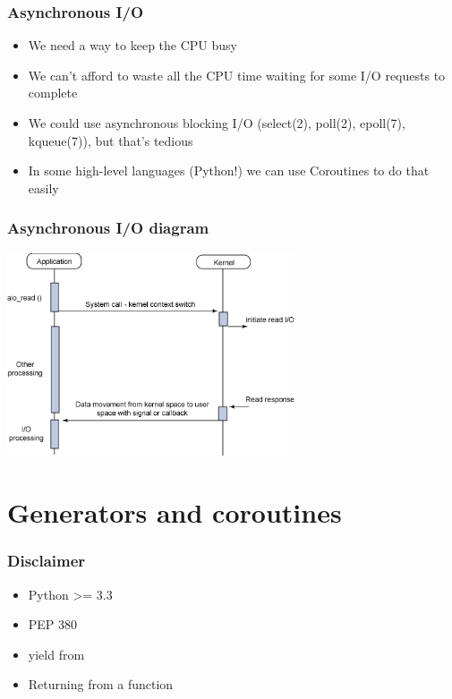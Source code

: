 \documentclass[ignorenonframetext,]{beamer}
\begin{document}
\begin{frame}[fragile]\frametitle{Asynchronous I/O}

\begin{itemize}[<+->]
\itemsep1pt\parskip0pt
\item
  We need a way to keep the CPU busy
\item
  We can't afford to waste all the CPU time waiting for some I/O
  requests to complete
\item
  We could use asynchronous blocking I/O (select(2), poll(2), epoll(7),
  kqueue(7)), but that's tedious
\item
  In some high-level languages (Python!) we can use Coroutines to do
  that easily
\end{itemize}

\end{frame}

\begin{frame}[fragile]\frametitle{Asynchronous I/O diagram}

\begin{center}
 \includegraphics[height=6cm]{img/asynchronous}
\end{center}

\end{frame}

\section{Generators and coroutines}

\begin{frame}[fragile]\frametitle{Disclaimer}

\begin{itemize}[<+->]
\itemsep1pt\parskip0pt
\item
  Python \textgreater{}= 3.3
\item
  PEP 380
\item
  yield from
\item
  Returning from a function
\end{itemize}

\end{frame}
\end{document}
